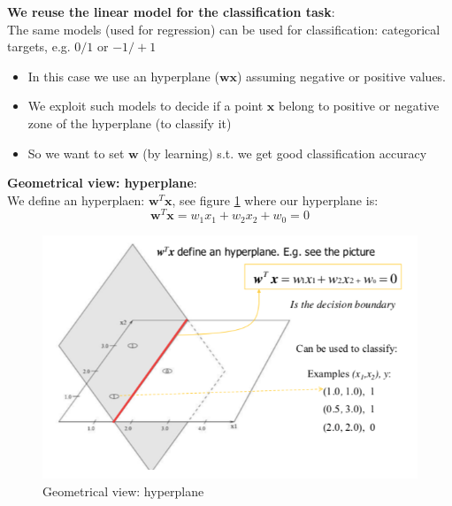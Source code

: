 \documentclass[../main.tex]{subfiles}
\begin{document}
\noindent \textbf{We reuse the linear model for the classification task}:\\

The same models (used for regression) can be used for classification: categorical targets, e.g. $0/1$ or $-1/+1$

\begin{itemize}
    \item In this case we use an hyperplane ($\mathbf{wx}$) assuming negative or positive values.
    \item We exploit such models to decide if a point $\mathbf{x}$ belong to positive or negative zone of the hyperplane (to classify it)
    \item So we want to set $\mathbf{w}$ (by learning) s.t. we get good classification accuracy
\end{itemize}

\noindent \textbf{Geometrical view: hyperplane}:\\

We define an hyperplaen: $\mathbf{w}^T\mathbf{x}$, see figure \ref{fig:2_hyperplane} where our hyperplane is:
$$ \mathbf{w}^T\mathbf{x} = w_1x_1 + w_2x_2 +w_0 = 0$$
\begin{figure}[H]
    \centering
    \includegraphics[scale = 0.3]{lectures/2_linear_model/2_hyperplane.png}
    \caption{Geometrical view: hyperplane}
    \label{fig:2_hyperplane}
\end{figure}
\end{document}
